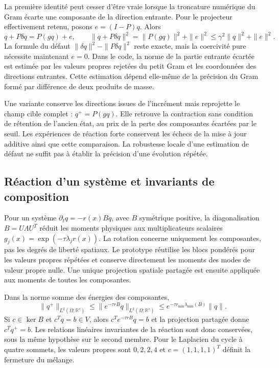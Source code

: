 \documentclass[11pt,a4paper]{article}
\begin{document}
La première identité peut cesser d'être vraie lorsque la troncature
numérique du Gram écarte une composante de la direction entrante.
Pour le projecteur effectivement retenu, posons $e=(I-P)q$. Alors
\[
 q+P\delta q=P(gq)+e,\qquad
 \|q+P\delta q\|^2=\|P(gq)\|^2+\|e\|^2
 \leq\gamma^2\|q\|^2+\|e\|^2.
\]
La formule du défaut $\|\delta q\|^2-\|P\delta q\|^2$ reste exacte,
mais la coercivité pure nécessite maintenant $e=0$.
Dans le code, la norme de la partie entrante écartée est estimée par
les valeurs propres rejetées du petit Gram et les coordonnées des
directions entrantes. Cette estimation dépend elle-même de la précision
du Gram formé par différence de deux produits de masse.

Une variante conserve les directions issues de l'incrément mais
reprojette le champ cible complet : $q^+=P(gq)$. Elle retrouve la
contraction sans condition de rétention de l'ancien état, au prix
de la perte des composantes écartées par le seuil. Les expériences
de réaction forte conservent les échecs de la mise à jour additive
ainsi que cette comparaison. La robustesse locale d'une estimation
de défaut ne suffit pas à établir la précision d'une évolution répétée.

\subsection{Réaction d'un système et invariants de composition}
Pour un système $\partial_tq=-r(x)Bq$, avec $B$ symétrique positive,
la diagonalisation $B=U\Lambda U^T$ réduit les moments physiques
aux multiplicateurs scalaires $g_j(x)=\exp(-\tau\lambda_jr(x))$.
La rotation concerne uniquement les composantes, pas les degrés de
liberté spatiaux. Le prototype réutilise les blocs pondérés pour les
valeurs propres répétées et conserve directement les moments des
modes de valeur propre nulle. Une unique projection spatiale partagée
est ensuite appliquée aux moments de toutes les composantes.

Dans la norme somme des énergies des composantes,
\[
 \|q^+\|_{L^2(\Omega;\mathbb R^s)}
 \leq \|e^{-\tau r B}q\|_{L^2(\Omega;\mathbb R^s)}
 \leq e^{-\tau r_{\min}\lambda_{\min}(B)}\|q\|.
\]
Si $c\in\ker B$ et $c^Tq=b\in V$, alors
$c^Te^{-\tau rB}q=b$ et la projection partagée donne
$c^Tq^+=b$. Les relations linéaires invariantes de la réaction
sont donc conservées, sous la même hypothèse sur le second membre.
Pour le Laplacien du cycle à quatre sommets, les valeurs propres
sont $0,2,2,4$ et $c=(1,1,1,1)^T$ définit la fermeture du mélange.
\end{document}
